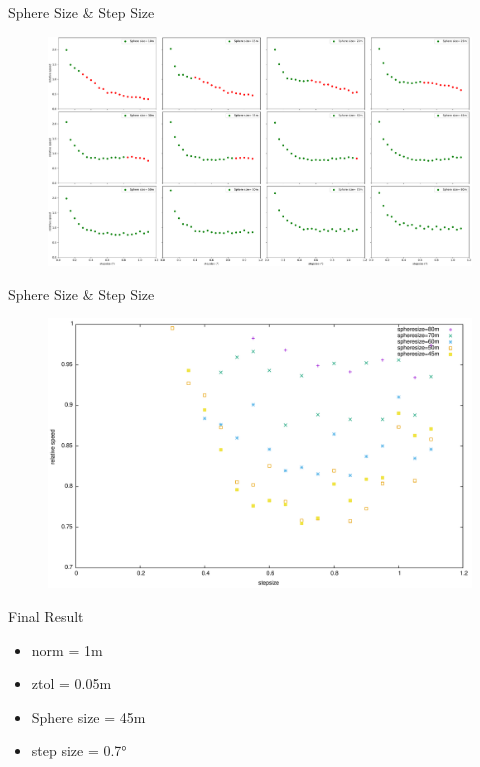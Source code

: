\documentclass{beamer}
\begin{document}
\begin{frame}{Sphere Size \& Step Size}
	\begin{figure}
		\includegraphics[width=\textwidth]{figures/subplotallsphereandstep.pdf}
	\end{figure}
\end{frame}
\begin{frame}{Sphere Size \& Step Size}
	\begin{figure}
		\includegraphics[width=\textwidth]{figures/SphereAndStepFinal.pdf}
	\end{figure}
\end{frame}
\begin{frame}{Final Result}
	\begin{itemize}
		\item norm = 1m
		\item ztol = 0.05m
		\item Sphere size = 45m
		\item step size = 0.7°
	\end{itemize}
\end{frame}
\end{document}
